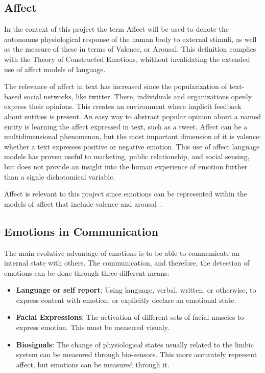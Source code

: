 
\subsection{Affect}\label{sub:Affect}
In the context of this project the term Affect will be used to denote the autonomus physiological response of the human body to external stimuli, as well as the measure of these in terms of Valence, or Arousal. This definition complies with the Theory of Constructed Emotions, whithout invalidating the extended use of affect models of language.

The relevance of affect in text has increased since the popularization of text-based social networks, like twitter. There, individuals and organizations openly express their opinions. This creates an environment where implicit feedback about entities is present. An easy way to abstract popular opinion about a named entity is learning the affect expressed in text, such as a tweet. Affect can be a multidimensional phenomenon, but the most important dimension of it is valence: whether a text expresses positive or negative emotion. This use of affect language models has proven useful to marketing, public relationship, and social sensing, but does not provide an insight into the human experience of emotion further than a signle dichotomical variable.

Affect is relevant to this project since emotions can be represented within the models of affect that include valence and arousal~\cite{barradas2016thesis}.

\subsection{Emotions in Communication}\label{sub:Emotions in Communication}
The main evolutive advantage of emotions is to be able to communicate an internal state with others. The communication, and therefore, the detection of emotions can be done through three different means:
\begin{itemize}
  \item \textbf{Language or self report}: Using language, verbal, written, or otherwise, to express content with emotion, or explicitly declare an emotional state.
  \item \textbf{Facial Expressions}: The activation of different sets of facial muscles to express emotion. This must be measured visualy.
  \item \textbf{Biosignals}: The change of physiological states usually related to the limbic system can be measured through bio-sensors. This more accurately represent affect, but emotions can be measured through it.
\end{itemize}

